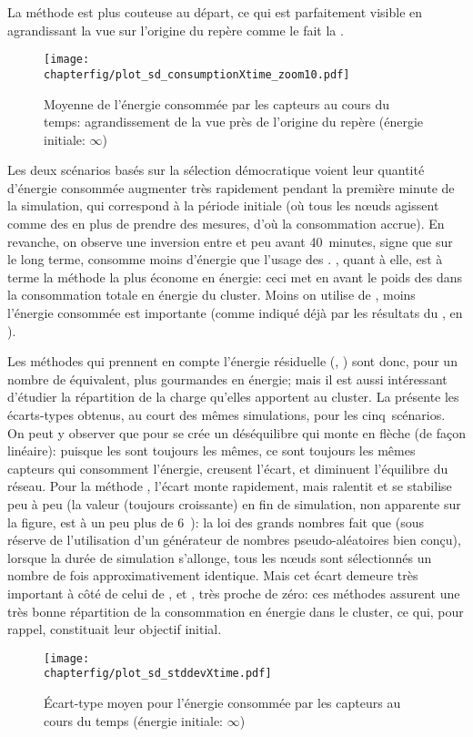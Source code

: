 La méthode \iddemx est plus couteuse au départ, ce qui est parfaitement visible en agrandissant la vue sur l'origine du repère comme le fait la .
\begin{figure}[!ht]
    \centering
    \texttt{[image: \\chapterfig/plot\_sd\_consumptionXtime\_zoom10.pdf]}
    \caption{Moyenne de l'énergie consommée par les capteurs au cours du temps: agrandissement de la vue près de l'origine du repère (énergie initiale: $\infty$)}\label{sd:fig:cons-inf-zoom}
\end{figure}
Les deux scénarios basés sur la sélection démocratique voient leur quantité d'énergie consommée augmenter très rapidement pendant la première minute de la simulation, qui correspond à la période initiale (où tous les nœuds agissent comme des \cns en plus de prendre des mesures, d'où la consommation accrue).
En revanche, on observe une inversion entre \ideres et \iddemx peu avant 40~minutes, signe que sur le long terme, \iddemx consomme moins d'énergie que l'usage des \vns.
\iddems, quant à elle, est à terme la méthode la plus économe en énergie: ceci met en avant le poids des \cns dans la consommation totale en énergie du cluster.
Moins on utilise de \cns, moins l'énergie consommée est importante (comme indiqué déjà par les résultats du , en ).

Les méthodes qui prennent en compte l'énergie résiduelle (\ideres, \iddemx) sont donc, pour un nombre de \cns équivalent, plus gourmandes en énergie; mais il est aussi intéressant d'étudier la répartition de la charge qu'elles apportent au cluster.
La  présente les écarts-types obtenus, au court des mêmes simulations, pour les cinq~scénarios.
On peut y observer que pour \idstat se crée un déséquilibre qui monte en flèche (de façon linéaire): puisque les \cns sont toujours les mêmes, ce sont toujours les mêmes capteurs qui consomment l'énergie, creusent l'écart, et diminuent l'équilibre du réseau.
Pour la méthode \idrand, l'écart monte rapidement, mais ralentit et se stabilise peu à peu (la valeur (toujours croissante) en fin de simulation, non apparente sur la figure, est à un peu plus de 6~\joule): la loi des grands nombres fait que (sous réserve de l'utilisation d'un générateur de nombres pseudo-aléatoires bien conçu), lorsque la durée de simulation s'allonge, tous les nœuds sont sélectionnés un nombre de fois approximativement identique.
Mais cet écart demeure très important à côté de celui de \ideres, \iddemx et \iddems, très proche de zéro: ces méthodes assurent une très bonne répartition de la consommation en énergie dans le cluster, ce qui, pour rappel, constituait leur objectif initial.
\begin{figure}[!ht]
    \centering
    \texttt{[image: \\chapterfig/plot\_sd\_stddevXtime.pdf]}
    \caption{Écart-type moyen pour l'énergie consommée par les capteurs au cours du temps (énergie initiale: $\infty$)}\label{sd:fig:stddev-inf}
\end{figure}

